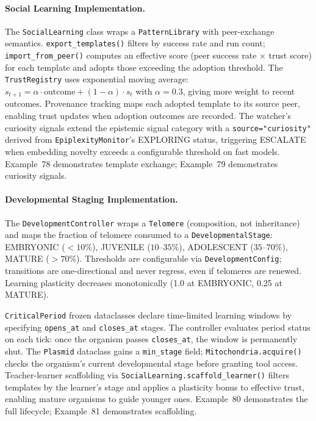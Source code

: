 \paragraph{Social Learning Implementation.}
\label{sec:social-learning-impl}
The \texttt{SocialLearning} class wraps a \texttt{PatternLibrary} with peer-exchange semantics. \texttt{export\_templates()} filters by success rate and run count; \texttt{import\_from\_peer()} computes an effective score (peer success rate $\times$ trust score) for each template and adopts those exceeding the adoption threshold. The \texttt{TrustRegistry} uses exponential moving average: $s_{t+1} = \alpha \cdot \text{outcome} + (1-\alpha) \cdot s_t$ with $\alpha=0.3$, giving more weight to recent outcomes. Provenance tracking maps each adopted template to its source peer, enabling trust updates when adoption outcomes are recorded. The watcher's curiosity signals extend the epistemic signal category with a \texttt{source="curiosity"} derived from \texttt{EpiplexityMonitor}'s EXPLORING status, triggering ESCALATE when embedding novelty exceeds a configurable threshold on fast models. Example~78 demonstrates template exchange; Example~79 demonstrates curiosity signals.

\paragraph{Developmental Staging Implementation.}
\label{sec:developmental-impl}
The \texttt{DevelopmentController} wraps a \texttt{Telomere} (composition, not inheritance) and maps the fraction of telomere consumed to a \texttt{DevelopmentalStage}: EMBRYONIC ($<10\%$), JUVENILE ($10\text{--}35\%$), ADOLESCENT ($35\text{--}70\%$), MATURE ($>70\%$). Thresholds are configurable via \texttt{DevelopmentConfig}; transitions are one-directional and never regress, even if telomeres are renewed. Learning plasticity decreases monotonically (1.0 at EMBRYONIC, 0.25 at MATURE).

\texttt{CriticalPeriod} frozen dataclasses declare time-limited learning windows by specifying \texttt{opens\_at} and \texttt{closes\_at} stages. The controller evaluates period status on each tick: once the organism passes \texttt{closes\_at}, the window is permanently shut. The \texttt{Plasmid} dataclass gains a \texttt{min\_stage} field; \texttt{Mitochondria.acquire()} checks the organism's current developmental stage before granting tool access. Teacher-learner scaffolding via \texttt{SocialLearning.scaffold\_learner()} filters templates by the learner's stage and applies a plasticity bonus to effective trust, enabling mature organisms to guide younger ones. Example~80 demonstrates the full lifecycle; Example~81 demonstrates scaffolding.

